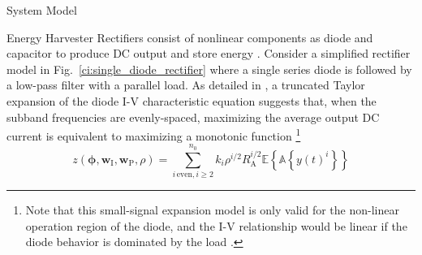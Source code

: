 \documentclass[journal]{IEEEtran}
\begin{document}
\begin{section}{System Model}
\begin{subsection}{Energy Harvester}
			Rectifiers consist of nonlinear components as diode and capacitor to produce DC output and store energy \cite{Pinuela2013}. Consider a simplified rectifier model in Fig.~\ref{ci:single_diode_rectifier} where a single series diode is followed by a low-pass filter with a parallel load. As detailed in \cite{Clerckx2016a,Clerckx2018b}, a truncated Taylor expansion of the diode I-V characteristic equation suggests that, when the subband frequencies are evenly-spaced, maximizing the average output DC current is equivalent to maximizing a monotonic function \footnote{Note that this small-signal expansion model is only valid for the non-linear operation region of the diode, and the I-V relationship would be linear if the diode behavior is dominated by the load \cite{Clerckx2016a}.}
			\begin{equation}\label{eq:z}
				z(\boldsymbol{\phi},\boldsymbol{w}_{\mathrm{I}},\boldsymbol{w}_{\mathrm{P}},\rho)=\sum_{i\,\mathrm{even},i\ge2}^{n_0}{k_i}{\rho^{i/2}}{R_{\mathrm{A}}^{i/2}}{\mathbb{E}\left\{\mathbb{A}\left\{y(t)^i\right\}\right\}}
			\end{equation}

\end{subsection}
\end{section}
\end{document}
